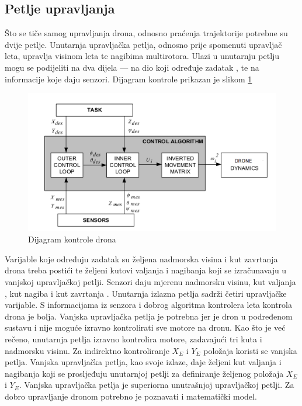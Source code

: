 \documentclass[times, utf8, diplomski]{fer}
\begin{document}
\subsection{Petlje upravljanja}
Što se tiče samog upravljanja drona, odnosno praćenja trajektorije potrebne su dvije petlje. Unutarnja upravljačka petlja, odnosno prije spomenuti upravljač leta, upravlja visinom leta te nagibima multirotora. Ulazi u unutarnju petlju mogu se podijeliti na dva dijela --- na dio koji određuje zadatak , te na informacije koje daju senzori. Dijagram kontrole prikazan je slikom \ref{fig:dijagramKontrola}
\begin{figure}[htb]
\centering
\includegraphics[width=14cm]{img/control_loop.png}
\caption{Dijagram kontrole drona}
\label{fig:dijagramKontrola}
\end{figure}
Varijable koje određuju zadatak su željena nadmorska visina i kut zavrtanja  drona treba postići te željeni kutovi valjanja  i nagibanja  koji se izračunavaju u vanjskoj upravljačkoj petlji. Senzori daju mjerenu nadmorsku visinu, kut valjanja , kut nagiba  i kut zavrtanja . Unutarnja izlazna petlja sadrži četiri upravljačke varijable. S informacijama iz senzora i dobrog algoritma kontrolera leta kontrola drona je bolja.
Vanjska upravljačka petlja je potrebna jer je dron u podređenom sustavu i nije moguće izravno kontrolirati sve motore na dronu. Kao što je već rečeno, unutarnja petlja izravno kontrolira motore, zadavajući tri kuta i nadmorsku visinu. Za indirektno kontroliranje $X_E$ i $Y_E$ položaja koristi se vanjska petlja. Vanjska upravljačka petlja, kao svoje izlaze, daje željeni kut valjanja  i nagibanja  koji se prosljeđuju unutarnjoj petlji za definiranje željenog položaja $X_E$ i $Y_E$. Vanjska upravljačka petlja je superiorna unutrašnjoj upravljačkoj petlji.
Za dobro upravljanje dronom potrebno je poznavati i matematički model.
\end{document}
